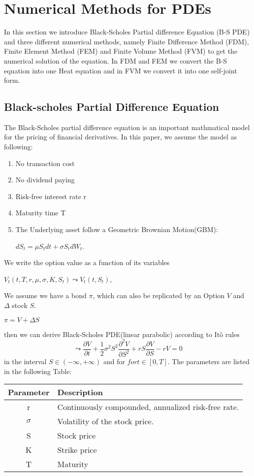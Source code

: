 \documentclass{article}
\begin{document}
\section{Numerical Methods for PDEs}
In this section we introduce Black-Scholes Partial difference Equation (B-S PDE) and three different numerical methods, namely Finite Difference Method (FDM), Finite Element Method (FEM) and Finite Volume Method (FVM) to get the numerical solution of the equation. In FDM and FEM we convert the B-S equation into one Heat equation and in FVM we convert it into one self-joint form.

\subsection{Black-scholes Partial Difference Equation}
The Black-Scholes partial difference equation is an important mathmatical model for the pricing of financial derivatives. In this paper, we assume the model as following:
\begin{enumerate}[1.]
	\item No transaction cost
	\item No dividend paying
	\item Risk-free interest rate r
	\item Maturity  time T
	\item The Underlying asset follow a Geometric Brownian Motion(GBM):
	\begin{center}
	$dS_{t} = \mu S_{t}dt + \sigma S_{t}dW_{t}$.
	\end{center}
\end{enumerate}
We write the option value as a function of its variables
\begin{center}
$V_t(t,T,r,\mu,\sigma, K, S_t)\leadsto V_t(t,S_t)$,
\end{center}
We assume we have a bond $\pi$, which can also be replicated by an Option $V$ and $\Delta$ stock $S$.
\begin{center}
	$\pi  = V + \Delta S$
\end{center}
then we can derive Black-Scholes PDE(linear parabolic) according to It\^{o} rules
$$\leadsto \frac{\partial V}{\partial t} + \frac{1}{2}\sigma^{2}S^2\frac{\partial^2 V}{\partial S^2} + rS\frac{\partial V}{\partial S} - rV = 0$$
in the interval $S \in (-\infty, +\infty)$ and for $for t \in [0, T]$. The parameters are listed in the following Table:
\begin{center}
	\begin{tabular}{|c|l|}
\hline
	Parameter & Description\\
\hline 
	r&Continuously compounded, annualized risk-free rate. \\
\hline 
	$\sigma$ & Volatility of the stock price. \\ 
\hline 
	S & Stock price \\ 
\hline 
	K & Strike price \\ 
\hline 
	T & Maturity \\ 
\hline 
	\end{tabular} 
\end{center}
\end{document}
